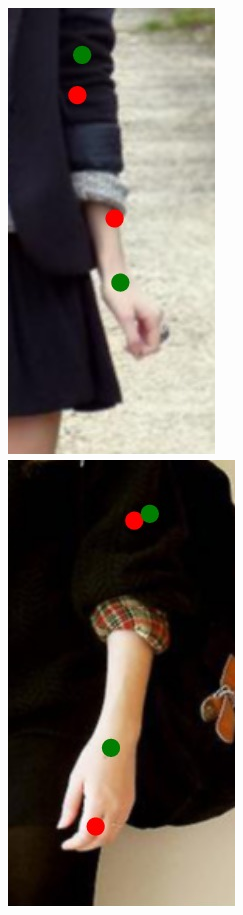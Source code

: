 \begin{figure}[!t]
    \includegraphics[height=\fh]{resources/Annotation_Correction/Fixing/fix_6}
    \hfill
    \includegraphics[height=\fh]{resources/Annotation_Correction/Fixing/fix_7}
    \hfill

\end{figure}
